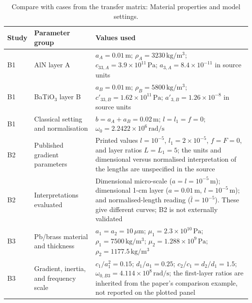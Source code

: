 \begin{table}[p]
\centering
\caption{ Compare with cases from the transfer matrix: Material properties and model settings.}
\label{tab:s1_transfer_parameters}
\footnotesize
\renewcommand{\arraystretch}{1.18}
\begin{tabular}{@{}p{}p{}p{}@{}}
\toprule
Study & Parameter group & Values used \\
\midrule
B1 & AlN layer A & $a_A=0.01\,\mathrm{m}$; $\rho_A=3230\,\mathrm{kg/m^3}$; $c_{33,A}=3.9\times10^{11}\,\mathrm{Pa}$; $a_{3,A}=8.4\times10^{-11}$ in source units \cite{li2024anchorB} \\
B1 & BaTiO$_3$ layer B & $a_B=0.01\,\mathrm{m}$; $\rho_B=5800\,\mathrm{kg/m^3}$; $c'_{33,B}=1.62\times10^{11}\,\mathrm{Pa}$; $a'_{3,B}=1.26\times10^{-8}$ in source units \cite{li2024anchorB} \\
B1 & Classical setting and normalisation & $b=a_A+a_B=0.02\,\mathrm{m}$; $l=l_1=f=0$; $\omega_0=2.2422\times10^6\,\mathrm{rad/s}$ \\
B2 & Published gradient parameters & Printed values $l=10^{-5}$, $l_1=2\times10^{-5}$, $f=F=0$, and layer ratios $L=L_1=5$; the units and dimensional versus normalised interpretation of the lengths are unspecified in the source \cite{li2024anchorB} \\
B2 & Interpretations evaluated & Dimensional micro-scale ($a=l=10^{-5}\,\mathrm{m}$); dimensional 1-cm layer ($a=0.01\,\mathrm{m}$, $l=10^{-5}\,\mathrm{m}$); and normalised-length reading ($\bar l=10^{-5}$). These give different curves; B2 is not externally validated \\
B3 & Pb/brass material and thickness & $a_1=a_2=10\,\mu\mathrm{m}$; $\mu_1=2.3\times10^{10}\,\mathrm{Pa}$; $\rho_1=7500\,\mathrm{kg/m^3}$; $\mu_2=1.288\times10^9\,\mathrm{Pa}$; $\rho_2=1177.5\,\mathrm{kg/m^3}$ \cite{li2023anchorA} \\
B3 & Gradient, inertia, and frequency scale & $c_1/a_1^2=0.15$; $d_1/a_1=0.25$; $c_2/c_1=d_2/d_1=1.5$; $\omega_{0,B3}=4.114\times10^8\,\mathrm{rad/s}$; the first-layer ratios are inherited from the paper's comparison example, not reported on the plotted panel \\
\bottomrule
\end{tabular}
\end{table}

